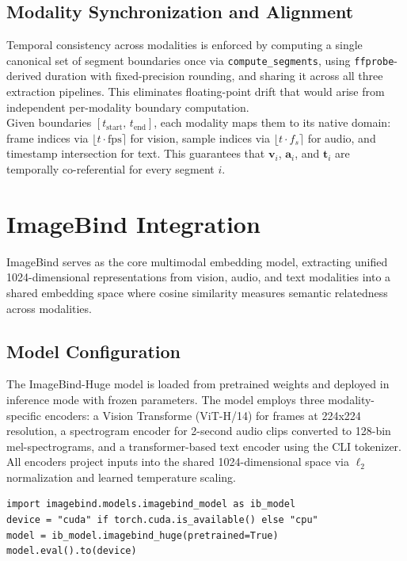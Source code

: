 \documentclass[12pt,a4paper,oneside,english]{book}
\begin{document}
\subsection{Modality Synchronization and Alignment}%
Temporal consistency across modalities is enforced by computing a single canonical set of segment boundaries once via \texttt{compute\_segments}, using \texttt{ffprobe}-derived duration with fixed-precision rounding, and sharing it across all three extraction pipelines. This eliminates floating-point drift that would arise from independent per-modality boundary computation.
\\Given boundaries $[t_{\text{start}},\, t_{\text{end}}]$, each modality maps them to its native domain: frame indices via $\lfloor t \cdot \text{fps} \rceil$ for vision, sample indices via $\lfloor t \cdot f_s \rceil$ for audio, and timestamp intersection for text. This guarantees that $\mathbf{v}_i$, $\mathbf{a}_i$, and $\mathbf{t}_i$ are temporally co-referential for every segment $i$.

\section{ImageBind Integration}
\label{sec:imagebind_integration}
ImageBind \citep{girdhar2023imagebindembeddingspacebind} serves as the core multimodal embedding model, extracting unified 1024-dimensional representations from vision, audio, and text modalities into a shared embedding space where cosine similarity measures semantic relatedness across modalities.

\subsection{Model Configuration}
\label{subsec:imagebind_config}

The ImageBind-Huge model is loaded from pretrained weights and deployed in inference mode with frozen parameters. The model employs three modality-specific encoders: a Vision Transforme (ViT-H/14) for frames at 224x224 resolution, a spectrogram encoder for 2-second audio clips converted to 128-bin mel-spectrograms, and a transformer-based text encoder using the CLI tokenizer. All encoders project inputs into the shared 1024-dimensional space via $\ell_2$ normalization and learned temperature scaling.

\begin{lstlisting}
import imagebind.models.imagebind_model as ib_model
device = "cuda" if torch.cuda.is_available() else "cpu"
model = ib_model.imagebind_huge(pretrained=True)
model.eval().to(device)
\end{lstlisting}
\end{document}
